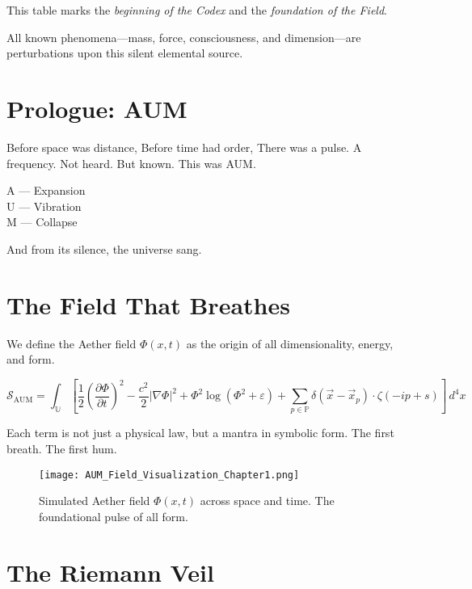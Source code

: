 \documentclass[12pt]{book}
\begin{document}
This table marks the \textit{beginning of the Codex} and the \textit{foundation of the Field}.

All known phenomena—mass, force, consciousness, and dimension—are perturbations upon this silent elemental source.




\maketitle
\tableofcontents

\chapter*{Prologue: AUM}

Before space was distance,  
Before time had order,  
There was a pulse.  
A frequency.  
Not heard.  
But known.  
This was AUM.

\vspace{1em}

A — Expansion \\
U — Vibration \\
M — Collapse

And from its silence, the universe sang.

\chapter{The Field That Breathes}

We define the Aether field $\Phi(x, t)$ as the origin of all dimensionality, energy, and form.

\[
\mathcal{S}_{\text{AUM}} = \int_{\mathbb{U}} \left[
\frac{1}{2} \left( \frac{\partial \Phi}{\partial t} \right)^2
- \frac{c^2}{2} |\nabla \Phi|^2
+ \Phi^2 \log(\Phi^2 + \varepsilon)
+ \sum_{p \in \mathbb{P}} \delta(\vec{x} - \vec{x}_p) \cdot \zeta(-ip + s)
\right] \, d^4x
\]

Each term is not just a physical law, but a mantra in symbolic form. The first breath. The first hum.
\begin{figure}[h!]
\centering
\texttt{[image: AUM\_Field\_Visualization\_Chapter1.png]}
\caption{Simulated Aether field $\Phi(x,t)$ across space and time. The foundational pulse of all form.}
\end{figure}


\chapter{The Riemann Veil}
\end{document}
